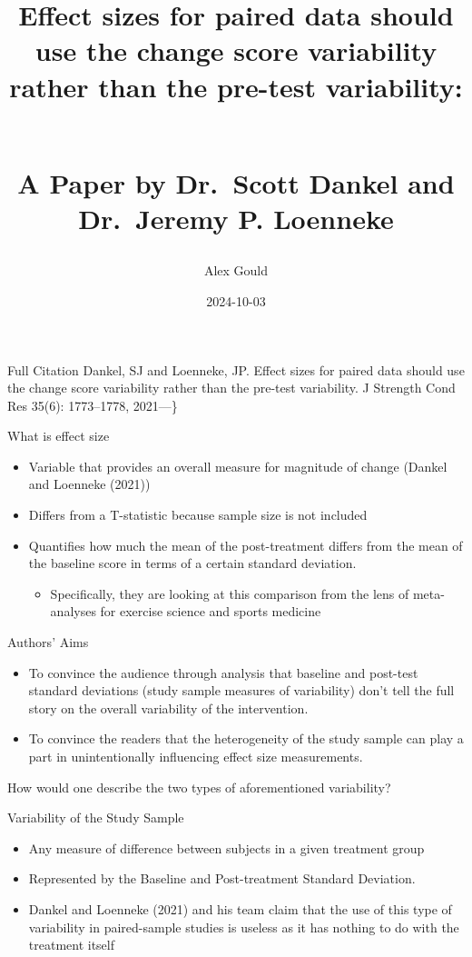 \documentclass[
  ignorenonframetext,
  aspectratio=169,
]{beamer}
\title{Effect sizes for paired data should use the change score
variability rather than the pre-test variability:\\
\strut \\
A Paper by Dr.~Scott Dankel and Dr.~Jeremy P. Loenneke}
\author{Alex Gould}
\date{2024-10-03}
\providecommand{\tightlist}{%
  \setlength{\itemsep}{0pt}\setlength{\parskip}{0pt}}
\begin{document}
\frame{\titlepage}

\begin{frame}{Full Citation}
\protect\hypertarget{full-citation}{}
Dankel, SJ and Loenneke, JP. Effect sizes for paired data should use the
change score variability rather than the pre-test variability. J
Strength Cond Res 35(6): 1773--1778, 2021---\}
\end{frame}

\begin{frame}{What is effect size}
\protect\hypertarget{what-is-effect-size}{}
\begin{itemize}
\tightlist
\item
  Variable that provides an overall measure for magnitude of change
  (Dankel and Loenneke (2021))
\item
  Differs from a T-statistic because sample size is not included
\item
  Quantifies how much the mean of the post-treatment differs from the
  mean of the baseline score in terms of a certain standard deviation.

  \begin{itemize}
  \tightlist
  \item
    Specifically, they are looking at this comparison from the lens of
    meta-analyses for exercise science and sports medicine
  \end{itemize}
\end{itemize}
\end{frame}

\begin{frame}{Authors' Aims}
\protect\hypertarget{authors-aims}{}
\begin{itemize}
\tightlist
\item
  To convince the audience through analysis that baseline and post-test
  standard deviations (study sample measures of variability) don't tell
  the full story on the overall variability of the intervention.
\item
  To convince the readers that the heterogeneity of the study sample can
  play a part in unintentionally influencing effect size measurements.
\end{itemize}

How would one describe the two types of aforementioned variability?
\end{frame}

\begin{frame}{Variability of the Study Sample}
\protect\hypertarget{variability-of-the-study-sample}{}
\begin{itemize}
\tightlist
\item
  Any measure of difference between subjects in a given treatment group
\item
  Represented by the Baseline and Post-treatment Standard Deviation.
\item
  Dankel and Loenneke (2021) and his team claim that the use of this
  type of variability in paired-sample studies is useless as it has
  nothing to do with the treatment itself
\end{itemize}
\end{frame}
\end{document}

